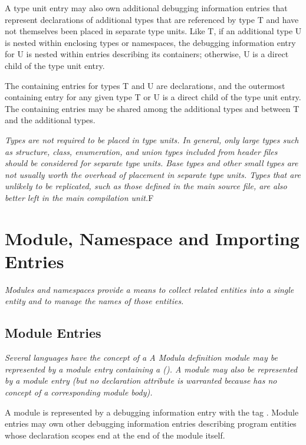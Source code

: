 A type unit entry may also own additional debugging information
entries that represent declarations of additional types that
are referenced by type T and have not themselves been placed in
separate type units. Like T, if an additional type U is nested
within enclosing types or namespaces, the debugging information
entry for U is nested within entries describing its containers;
otherwise, U is a direct child of the type unit entry.

The containing entries for types T and U are declarations,
and the outermost containing entry for any given type T or
U is a direct child of the type unit entry. The containing
entries may be shared among the additional types and between
T and the additional types.

\textit{Types are not required to be placed in type units. In general,
only large types such as structure, class, enumeration, and
union types included from header files should be considered
for separate type units. Base types and other small types
are not usually worth the overhead of placement in separate
type units. Types that are unlikely to be replicated, such
as those defined in the main source file, are also better
left in the main compilation unit.}F

\section{Module, Namespace and Importing Entries}
\textit{Modules and namespaces provide a means to collect related
entities into a single entity and to manage the names of
those entities.}

\subsection{Module Entries}
\label{chap:moduleentries}
\textit{Several languages have the concept of a 
A Modula definition module 
may be represented by a module
entry containing a 
(\DWATdeclaration). A
 module 
may also be represented by a module entry
(but no declaration attribute is warranted because 
has no concept of a corresponding module body).}

A module is represented by a debugging information entry
with the 
tag \DWTAGmoduleTARG.  
Module entries may own other
debugging information entries describing program entities
whose declaration scopes end at the end of the module itself.

